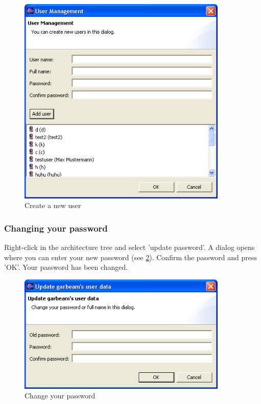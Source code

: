 \begin{figure}[h!]
\begin{center}
\includegraphics[width=10cm]{createuser1.png}
   \caption{Create a new user}
\label{createuser1}
\end{center}
\end{figure}\par


\subsubsection{Changing your password}

Right-click in the architecture tree and select 'update password'. A dialog opens where you can
enter your new password (see \ref{password}). Confirm the password and press 'OK'. Your password has been changed.

\begin{figure}[h!]
\begin{center}
\includegraphics[width=10cm]{password.png}
   \caption{Change your password}
\label{password}
\end{center}
\end{figure}\par

